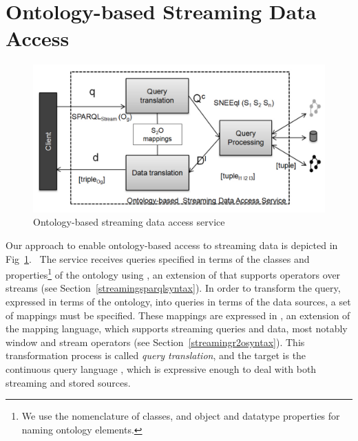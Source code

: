\section{Ontology-based Streaming Data Access}
\label{approach}



\begin{figure}[t]
  \centering
  \includegraphics[width=.8\textwidth]{img/approachImg}
  \caption{Ontology-based streaming data access service} 
  \label{fig:SemanticIntegrator} 
\end{figure}

Our approach to enable ontology-based access to streaming data is depicted in Fig~\ref{fig:SemanticIntegrator}.\ %
The service receives queries specified in terms of the classes and properties\footnote{We use the \owl nomenclature of classes, and object and datatype properties for naming ontology elements.} of the ontology using \sparqlstr, an extension of \sparql that supports operators over \rdf streams (see Section~\ref{streamingsparqlsyntax}). 
In order to transform the \sparqlstr query, expressed in terms of the ontology, into queries in terms of the data sources, a set of mappings must be specified. 
These mappings are expressed in \stwoo, an extension of the \rtwoo mapping language, which supports streaming queries and data, most notably window and stream operators (see Section~\ref{streamingr2osyntax}). 
This transformation process is called \textit{query translation}, and the target is the continuous query language \sneeql, which is expressive enough to deal with both streaming and stored sources.


